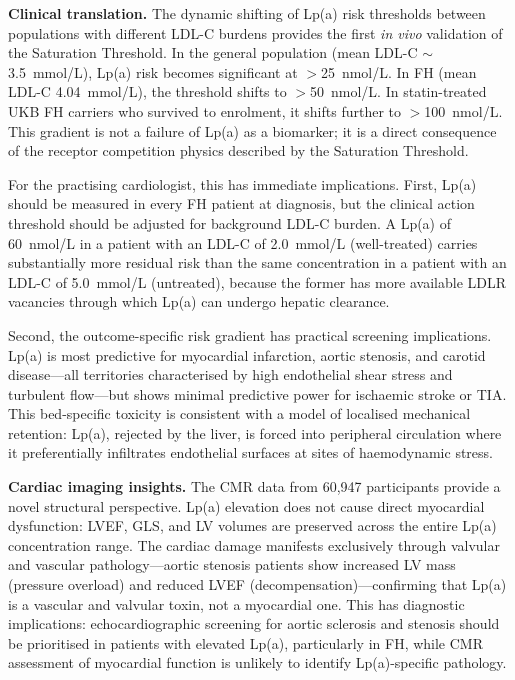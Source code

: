 \documentclass[11pt,a4paper]{article}
\newcommand{\lpa}{Lp(a)}
\begin{document}
\textbf{Clinical translation.} The dynamic shifting of \lpa{} risk thresholds between populations with different LDL-C burdens provides the first \textit{in vivo} validation of the Saturation Threshold. In the general population (mean LDL-C $\sim$3.5~mmol/L), \lpa{} risk becomes significant at $>$25~nmol/L. In FH (mean LDL-C 4.04~mmol/L), the threshold shifts to $>$50~nmol/L. In statin-treated UKB FH carriers who survived to enrolment, it shifts further to $>$100~nmol/L. This gradient is not a failure of \lpa{} as a biomarker; it is a direct consequence of the receptor competition physics described by the Saturation Threshold.

For the practising cardiologist, this has immediate implications. First, \lpa{} should be measured in every FH patient at diagnosis, but the clinical action threshold should be adjusted for background LDL-C burden. A \lpa{} of 60~nmol/L in a patient with an LDL-C of 2.0~mmol/L (well-treated) carries substantially more residual risk than the same concentration in a patient with an LDL-C of 5.0~mmol/L (untreated), because the former has more available LDLR vacancies through which \lpa{} can undergo hepatic clearance.

Second, the outcome-specific risk gradient has practical screening implications. \lpa{} is most predictive for myocardial infarction, aortic stenosis, and carotid disease---all territories characterised by high endothelial shear stress and turbulent flow---but shows minimal predictive power for ischaemic stroke or TIA. This bed-specific toxicity is consistent with a model of localised mechanical retention: \lpa{}, rejected by the liver, is forced into peripheral circulation where it preferentially infiltrates endothelial surfaces at sites of haemodynamic stress\cite{thanassoulis2013,capoulade2020}.

\textbf{Cardiac imaging insights.} The CMR data from 60{,}947 participants provide a novel structural perspective. \lpa{} elevation does not cause direct myocardial dysfunction: LVEF, GLS, and LV volumes are preserved across the entire \lpa{} concentration range. The cardiac damage manifests exclusively through valvular and vascular pathology---aortic stenosis patients show increased LV mass (pressure overload) and reduced LVEF (decompensation)---confirming that \lpa{} is a vascular and valvular toxin, not a myocardial one. This has diagnostic implications: echocardiographic screening for aortic sclerosis and stenosis should be prioritised in patients with elevated \lpa{}, particularly in FH, while CMR assessment of myocardial function is unlikely to identify \lpa{}-specific pathology.
\end{document}
